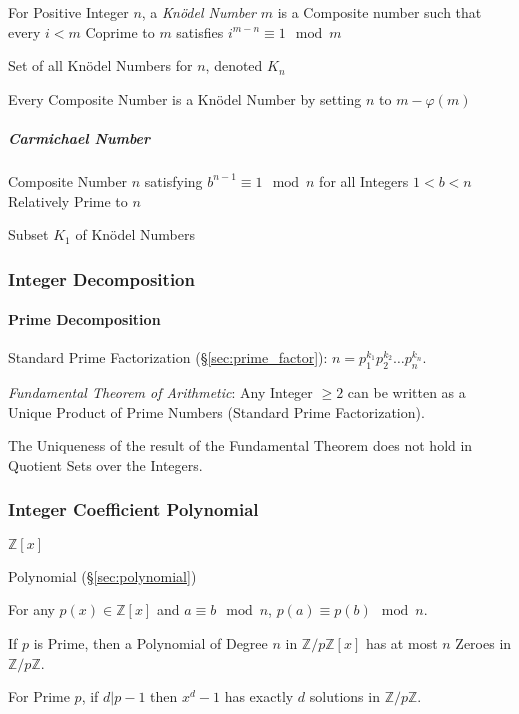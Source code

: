 For Positive Integer $n$, a \emph{Kn\"odel Number} $m$ is a Composite
number such that every $i < m$ Coprime to $m$ satisfies $i^{m-n}
\equiv 1 \mod m$

Set of all Kn\"odel Numbers for $n$, denoted $K_n$

Every Composite Number is a Kn\"odel Number by setting $n$ to $m -
\varphi(m)$



\subparagraph{Carmichael Number}\label{sec:carmichael_number}\hfill

Composite Number $n$ satisfying $b^{n-1} \equiv 1 \mod n$ for all
Integers $1 < b < n$ Relatively Prime to $n$

Subset $K_1$ of Kn\"odel Numbers



\subsubsection{Integer Decomposition}\label{sec:integer_decomposition}

\paragraph{Prime Decomposition}\label{sec:prime_decomposition}\hfill

Standard Prime Factorization (\S\ref{sec:prime_factor}): $n =
p_1^{k_1} p_2^{k_2} \ldots p_n^{k_n}$.

\emph{Fundamental Theorem of Arithmetic}: Any Integer $\geq 2$ can be
written as a Unique Product of Prime Numbers (Standard Prime
Factorization).

The Uniqueness of the result of the Fundamental Theorem does not hold
in Quotient Sets over the Integers.



\subsubsection{Integer Coefficient Polynomial}
\label{sec:integer_coefficient}

$\mathbb{Z}[x]$

Polynomial (\S\ref{sec:polynomial})

For any $p(x) \in \mathbb{Z}[x]$ and $a \equiv b \mod n$, $p(a) \equiv
p(b) \mod n$.

If $p$ is Prime, then a Polynomial of Degree $n$ in
$\mathbb{Z}/p\mathbb{Z}[x]$ has at most $n$ Zeroes in
$\mathbb{Z}/p\mathbb{Z}$.

For Prime $p$, if $d|p-1$ then $x^d - 1$ has exactly $d$ solutions in
$\mathbb{Z}/p\mathbb{Z}$.



